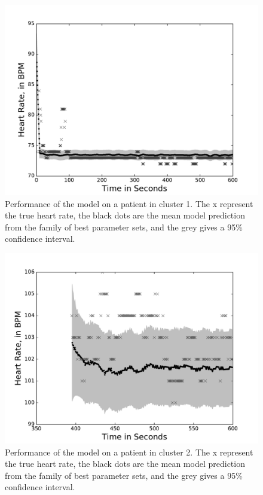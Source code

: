 \documentclass[fleqn,10pt]{wlscirep}
\begin{document}
\begin{figure}[ht]
                \centering
        \includegraphics[width=\linewidth]{figures/timedatausingdifferentparamsetsforpatients28611-3018-03-06-18-24n}
       \caption{Performance of the model on a patient in cluster 1. The x represent the true heart rate, the black dots are the mean model prediction from the family of best parameter sets, and the grey gives a 95\% confidence interval.}
       \label{fig:cluster1patientmulti}
\end{figure}
\begin{figure}[ht]
                \centering
        \includegraphics[width=\linewidth]{figures/timedatausingdifferentparamsetsforpatients32582-3106-02-22-22-22n}
       \caption{Performance of the model on a patient in cluster 2. The x represent the true heart rate, the black dots are the mean model prediction from the family of best parameter sets, and the grey gives a 95\% confidence interval.}
       \label{fig:cluster2patientmulti}
\end{figure}
\end{document}
